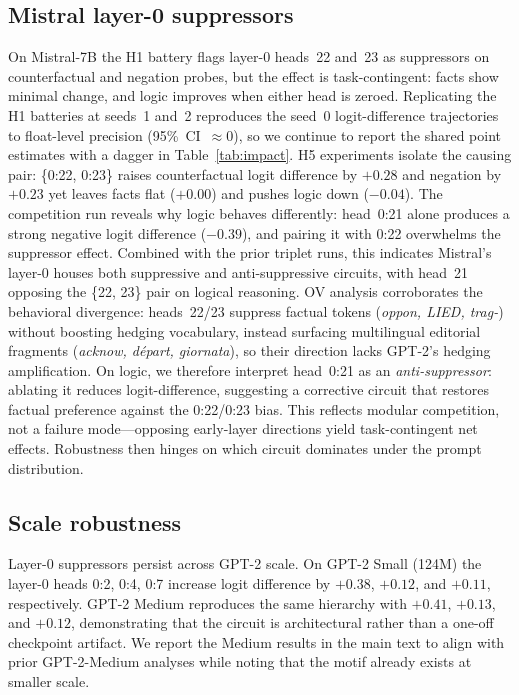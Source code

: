 \subsection{Mistral layer-0 suppressors}
On Mistral-7B the H1 battery flags layer-0 heads~22 and~23 as suppressors on counterfactual and negation probes, but the effect is task-contingent: facts show minimal change, and logic improves when either head is zeroed.
Replicating the H1 batteries at seeds~1 and~2 reproduces the seed~0 logit-difference trajectories to float-level precision (95\%~CI~$\approx 0$), so we continue to report the shared point estimates with a dagger in Table~\ref{tab:impact}.
H5 experiments isolate the causing pair: \{0:22, 0:23\} raises counterfactual logit difference by $+0.28$ and negation by $+0.23$ yet leaves facts flat ($+0.00$) and pushes logic down ($-0.04$).
The competition run reveals why logic behaves differently: head~0:21 alone produces a strong negative logit difference ($-0.39$), and pairing it with 0:22 overwhelms the suppressor effect.
Combined with the prior triplet runs, this indicates Mistral’s layer-0 houses both suppressive and anti-suppressive circuits, with head~21 opposing the \{22, 23\} pair on logical reasoning.
OV analysis corroborates the behavioral divergence: heads~22/23 suppress factual tokens (\emph{oppon, LIED, trag-}) without boosting hedging vocabulary, instead surfacing multilingual editorial fragments (\emph{acknow, départ, giornata}), so their direction lacks GPT-2’s hedging amplification.
 On logic, we therefore interpret head~0:21 as an \emph{anti-suppressor}: ablating it reduces logit-difference, suggesting a corrective circuit that restores factual preference against the 0:22/0:23 bias. This reflects modular competition, not a failure mode—opposing early-layer directions yield task-contingent net effects. Robustness then hinges on which circuit dominates under the prompt distribution.

\subsection{Scale robustness}
Layer-0 suppressors persist across GPT-2 scale. On GPT-2 Small (124M) the layer-0 heads {0:2, 0:4, 0:7} increase logit difference by $+0.38$, $+0.12$, and $+0.11$, respectively. GPT-2 Medium reproduces the same hierarchy with $+0.41$, $+0.13$, and $+0.12$, demonstrating that the circuit is architectural rather than a one-off checkpoint artifact. We report the Medium results in the main text to align with prior GPT-2-Medium analyses while noting that the motif already exists at smaller scale.

